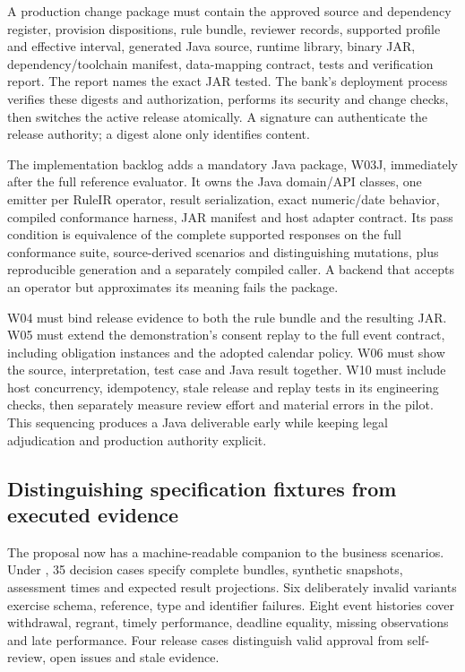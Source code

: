 \documentclass[12pt,a4paper,oneside,openany]{book}
\begin{document}
A production change package must contain the approved source and dependency
register, provision dispositions, rule bundle, reviewer records, supported
profile and effective interval, generated Java source, runtime library, binary
JAR, dependency/toolchain manifest, data-mapping contract, tests and verification
report. The report names the exact JAR tested. The bank's deployment process
verifies these digests and authorization, performs its security and change checks,
then switches the active release atomically. A signature can authenticate the
release authority; a digest alone only identifies content.

The implementation backlog adds a mandatory Java package, W03J, immediately
after the full reference evaluator. It owns the Java domain/API classes, one
emitter per RuleIR operator, result serialization, exact numeric/date behavior,
compiled conformance harness, JAR manifest and host adapter contract. Its pass
condition is equivalence of the complete supported responses on the full
conformance suite, source-derived scenarios and distinguishing mutations,
plus reproducible generation and a separately compiled caller. A backend that
accepts an operator but approximates its meaning fails the package.

W04 must bind release evidence to both the rule bundle and the resulting JAR.
W05 must extend the demonstration's consent replay to the full event contract,
including obligation instances and the adopted calendar policy. W06 must show
the source, interpretation, test case and Java result together. W10 must include
host concurrency, idempotency, stale release and replay tests in its engineering
checks, then separately measure review effort and material errors in the pilot.
This sequencing produces a Java deliverable early while keeping legal
adjudication and production authority explicit.

\subsection{Distinguishing specification fixtures from executed evidence}
\label{merge:P-05-evidence:01}


The proposal now has a machine-readable companion to the business scenarios.
Under , 35 decision cases specify complete bundles,
synthetic snapshots, assessment times and expected result projections. Six
deliberately invalid variants exercise schema, reference, type and identifier
failures. Eight event histories cover withdrawal, regrant, timely performance,
deadline equality, missing observations and late performance. Four release cases
distinguish valid approval from self-review, open issues and stale evidence.
\end{document}
